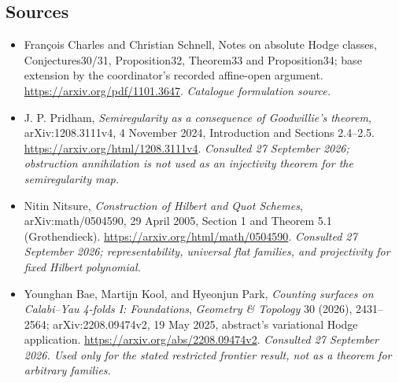 \documentclass[11pt,a4paper]{article}
\numberwithin{equation}{section}
\begin{document}
\subsection{Sources}
\begin{itemize}\raggedright
\item[\textnormal{[S1]}]\hypertarget{source:statement:1}{} François Charles and Christian Schnell, Notes on absolute Hodge classes, Conjectures30/31, Proposition32, Theorem33 and Proposition34; base extension by the coordinator's recorded affine-open argument.
\url{https://arxiv.org/pdf/1101.3647}.
{\small\textit{Catalogue formulation source.}}
\item[\textnormal{[E1]}]\hypertarget{extra:statement:1}{} J. P. Pridham,
\emph{Semiregularity as a consequence of Goodwillie's theorem},
arXiv:1208.3111v4, 4 November 2024, Introduction and Sections 2.4--2.5.
\url{https://arxiv.org/html/1208.3111v4}.
{\small\textit{Consulted 27 September 2026; obstruction annihilation is not
used as an injectivity theorem for the semiregularity map.}}
\item[\textnormal{[E2]}]\hypertarget{extra:statement:2}{} Nitin Nitsure,
\emph{Construction of Hilbert and Quot Schemes}, arXiv:math/0504590,
29 April 2005, Section 1 and Theorem 5.1 (Grothendieck).
\url{https://arxiv.org/html/math/0504590}.
{\small\textit{Consulted 27 September 2026; representability, universal
flat families, and projectivity for fixed Hilbert polynomial.}}
\item[\textnormal{[E3]}]\hypertarget{extra:statement:3}{} Younghan Bae, Martijn Kool,
and Hyeonjun Park, \emph{Counting surfaces on Calabi--Yau 4-folds I:
Foundations}, \emph{Geometry \& Topology} 30 (2026), 2431--2564;
arXiv:2208.09474v2, 19 May 2025, abstract's variational Hodge application.
\url{https://arxiv.org/abs/2208.09474v2}.
{\small\textit{Consulted 27 September 2026. Used only for the stated
restricted frontier result, not as a theorem for arbitrary families.}}
\end{itemize}
\end{document}

